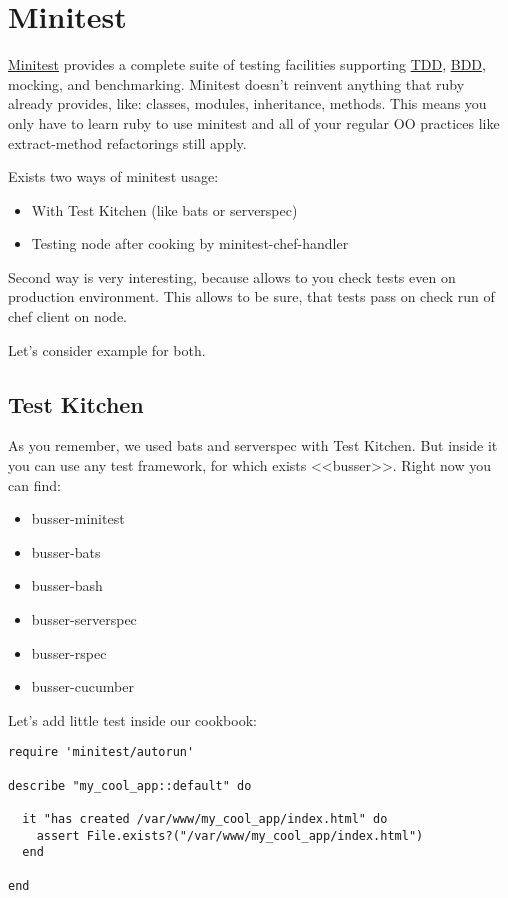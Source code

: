 \section{Minitest}
\label{sec:testing-minitest}

\href{https://github.com/seattlerb/minitest}{Minitest} provides a complete suite of testing facilities supporting \href{http://en.wikipedia.org/wiki/Test-driven\_development}{TDD}, \href{http://en.wikipedia.org/wiki/Behavior-driven\_development}{BDD}, mocking, and benchmarking. Minitest doesn't reinvent anything that ruby already provides, like: classes, modules, inheritance, methods. This means you only have to learn ruby to use minitest and all of your regular OO practices like extract-method refactorings still apply.

Exists two ways of minitest usage:

\begin{itemize}
  \item With Test Kitchen (like bats or serverspec)
  \item Testing node after cooking by minitest-chef-handler
\end{itemize}

Second way is very interesting, because allows to you check tests even on production environment. This allows to be sure, that tests pass on check run of chef client on node.

Let's consider example for both.

\subsection{Test Kitchen}

As you remember, we used bats and serverspec with Test Kitchen. But inside it you can use any test framework, for which exists <<busser>>. Right now you can find:

\begin{itemize}
  \item busser-minitest
  \item busser-bats
  \item busser-bash
  \item busser-serverspec
  \item busser-rspec
  \item busser-cucumber
\end{itemize}

Let's add little test inside our cookbook:

\begin{lstlisting}[label=lst:testing-minitest1]
require 'minitest/autorun'

describe "my_cool_app::default" do

  it "has created /var/www/my_cool_app/index.html" do
    assert File.exists?("/var/www/my_cool_app/index.html")
  end

end
\end{lstlisting}


